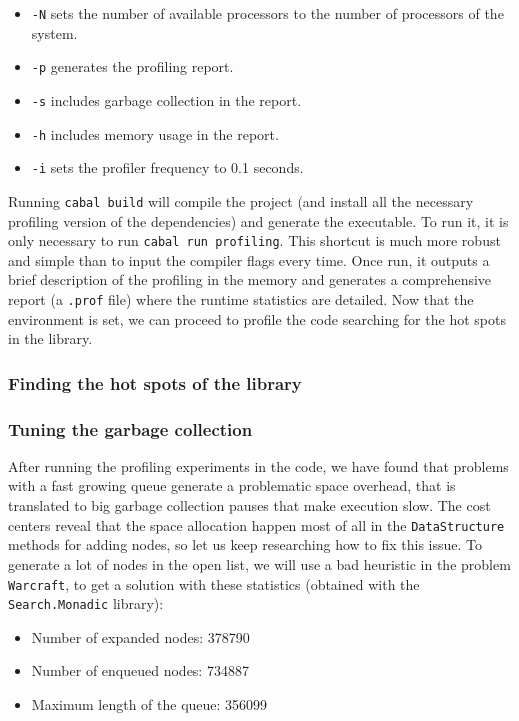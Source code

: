 \begin{itemize}
\item \texttt{-N} sets the number of available processors to the number of
  processors of the system.
\item \texttt{-p} generates the profiling report.
\item \texttt{-s} includes garbage collection in the report.
\item \texttt{-h} includes memory usage in the report.
\item \texttt{-i} sets the profiler frequency to 0.1 seconds.  
\end{itemize}

Running \texttt{cabal build} will compile the project (and install all the
necessary profiling version of the dependencies) and generate the executable.
To run it, it is only necessary to run \texttt{cabal run profiling}. This
shortcut is much more robust and simple than to input the compiler flags every
time. Once run, it outputs a brief description of the profiling in the memory
and generates a comprehensive report (a \texttt{.prof} file) where the runtime
statistics are detailed. Now that the environment is set, we can proceed to
profile the code searching for the hot spots in the library.


\subsubsection{Finding the hot spots of the library}



\subsubsection{Tuning the garbage collection}

After running the profiling experiments in the code, we have found that
problems with a fast growing queue generate a problematic space overhead, that
is translated to big garbage collection pauses that make execution slow. The
cost centers reveal that the space allocation happen most of all in the
\texttt{DataStructure} methods for adding nodes, so let us keep researching how
to fix this issue. To generate a lot of nodes in the open list, we will use a
bad heuristic in the problem \texttt{Warcraft}, to get a solution with these
statistics (obtained with the \texttt{Search.Monadic} library):

\begin{itemize}
 \item Number of expanded nodes: 378790
 \item Number of enqueued nodes: 734887
 \item Maximum length of the queue: 356099
\end{itemize}

